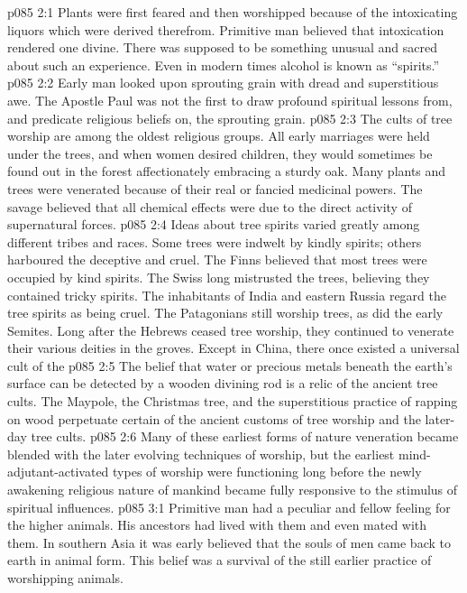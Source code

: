 \vs p085 2:1 Plants were first feared and then worshipped because of the intoxicating liquors which were derived therefrom. Primitive man believed that intoxication rendered one divine. There was supposed to be something unusual and sacred about such an experience. Even in modern times alcohol is known as “spirits.”
\vs p085 2:2 Early man looked upon sprouting grain with dread and superstitious awe. The Apostle Paul was not the first to draw profound spiritual lessons from, and predicate religious beliefs on, the sprouting grain.
\vs p085 2:3 The cults of tree worship are among the oldest religious groups. All early marriages were held under the trees, and when women desired children, they would sometimes be found out in the forest affectionately embracing a sturdy oak. Many plants and trees were venerated because of their real or fancied medicinal powers. The savage believed that all chemical effects were due to the direct activity of supernatural forces.
\vs p085 2:4 Ideas about tree spirits varied greatly among different tribes and races. Some trees were indwelt by kindly spirits; others harboured the deceptive and cruel. The Finns believed that most trees were occupied by kind spirits. The Swiss long mistrusted the trees, believing they contained tricky spirits. The inhabitants of India and eastern Russia regard the tree spirits as being cruel. The Patagonians still worship trees, as did the early Semites. Long after the Hebrews ceased tree worship, they continued to venerate their various deities in the groves. Except in China, there once existed a universal cult of the 
\vs p085 2:5 The belief that water or precious metals beneath the earth’s surface can be detected by a wooden divining rod is a relic of the ancient tree cults. The Maypole, the Christmas tree, and the superstitious practice of rapping on wood perpetuate certain of the ancient customs of tree worship and the later\hyp{}day tree cults.
\vs p085 2:6 Many of these earliest forms of nature veneration became blended with the later evolving techniques of worship, but the earliest mind\hyp{}adjutant\hyp{}activated types of worship were functioning long before the newly awakening religious nature of mankind became fully responsive to the stimulus of spiritual influences.
\vs p085 3:1 Primitive man had a peculiar and fellow feeling for the higher animals. His ancestors had lived with them and even mated with them. In southern Asia it was early believed that the souls of men came back to earth in animal form. This belief was a survival of the still earlier practice of worshipping animals.
